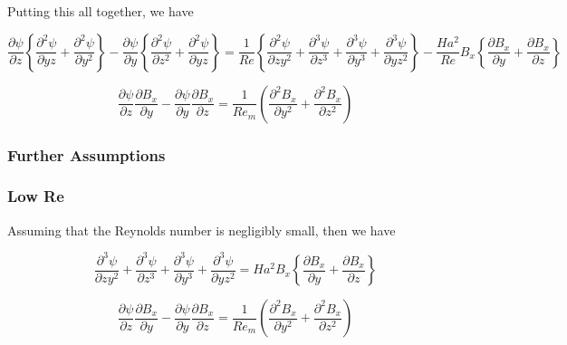 \documentclass[11pt]{article}
\begin{document}
Putting this all together, we have

\begin{equation}
	\frac{\partial \psi }{\partial z}
	\left\{
	\frac{\partial^2 \psi}{\partial yz}
	+
	\frac{\partial^2 \psi}{\partial y^2}
	\right\}
	-
	\frac{\partial \psi}{\partial y}
	\left\{
	\frac{\partial^2 \psi}{\partial z^2}
	+
	\frac{\partial^2 \psi}{\partial yz}
	\right\}
	=
	\frac{1}{Re}
	\left\{
	\frac{\partial^2 \psi}{\partial z y^2}
	+
	\frac{\partial^3 \psi}{\partial z^3}
	+
	\frac{\partial^3 \psi}{\partial y^3}
	+\frac{\partial^3 \psi}{\partial y z^2}
	\right\}
	- 
	\frac{Ha^2}{Re}
	B_x
	\left\{
	\frac{\partial B_x}{\partial y} 
	+
	\frac{\partial B_x}{\partial z}
	\right\}
\end{equation}

\begin{equation}
	\frac{\partial \psi}{\partial z}
	\frac{\partial B_x}{\partial y}
	-
	\frac{\partial \psi}{\partial y}
	\frac{\partial B_x}{\partial z}
	=
	\frac{1}{Re_m}
	\left(
	\frac{\partial^2 B_x}{\partial y^2}
	+ \frac{\partial^2 B_x}{\partial z^2}
	\right)
\end{equation}


\subsubsection{Further Assumptions}

\subsubsection{Low Re}
Assuming that the Reynolds number is negligibly small, then we have


\begin{equation}
	\frac{\partial^3 \psi}{\partial z y^2}
	+
	\frac{\partial^3 \psi}{\partial z^3}
	+
	\frac{\partial^3 \psi}{\partial y^3}
	+\frac{\partial^3 \psi}{\partial y z^2}
	=
	Ha^2
	B_x
	\left\{
	\frac{\partial B_x}{\partial y} 
	+
	\frac{\partial B_x}{\partial z}
	\right\}
\end{equation}

\begin{equation}
	\frac{\partial \psi}{\partial z}
	\frac{\partial B_x}{\partial y}
	-
	\frac{\partial \psi}{\partial y}
	\frac{\partial B_x}{\partial z}
	=
	\frac{1}{Re_m}
	\left(
	\frac{\partial^2 B_x}{\partial y^2}
	+ \frac{\partial^2 B_x}{\partial z^2}
	\right)
\end{equation}
\end{document}
